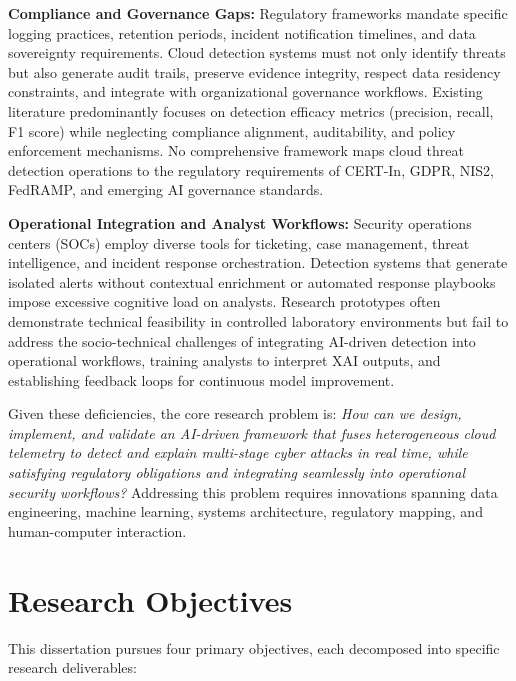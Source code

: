 \textbf{Compliance and Governance Gaps:} Regulatory frameworks mandate specific logging practices, retention periods, incident notification timelines, and data sovereignty requirements. Cloud detection systems must not only identify threats but also generate audit trails, preserve evidence integrity, respect data residency constraints, and integrate with organizational governance workflows. Existing literature predominantly focuses on detection efficacy metrics (precision, recall, F1 score) while neglecting compliance alignment, auditability, and policy enforcement mechanisms. No comprehensive framework maps cloud threat detection operations to the regulatory requirements of CERT-In, GDPR, NIS2, FedRAMP, and emerging AI governance standards.

\textbf{Operational Integration and Analyst Workflows:} Security operations centers (SOCs) employ diverse tools for ticketing, case management, threat intelligence, and incident response orchestration. Detection systems that generate isolated alerts without contextual enrichment or automated response playbooks impose excessive cognitive load on analysts. Research prototypes often demonstrate technical feasibility in controlled laboratory environments but fail to address the socio-technical challenges of integrating AI-driven detection into operational workflows, training analysts to interpret XAI outputs, and establishing feedback loops for continuous model improvement.

Given these deficiencies, the core research problem is: \emph{How can we design, implement, and validate an AI-driven framework that fuses heterogeneous cloud telemetry to detect and explain multi-stage cyber attacks in real time, while satisfying regulatory obligations and integrating seamlessly into operational security workflows?} Addressing this problem requires innovations spanning data engineering, machine learning, systems architecture, regulatory mapping, and human-computer interaction.

\section{Research Objectives}\label{sec:intro-objectives}
This dissertation pursues four primary objectives, each decomposed into specific research deliverables:

